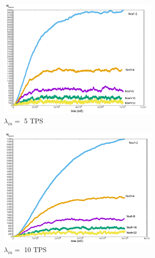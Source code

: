 \documentclass[a4paper,10pt,twocolumn]{article}
\begin{document}
\begin{appendices}
	 \space{1cm}
	
	 \begin{figure}[H]
		\begin{center}
		\includegraphics[width=80mm]{5sec.png}
		  \caption{\( \lambda_{in}=\) 5 TPS}
		\label{fig:sec5}
		\end{center}
	 \end{figure}
	
	 \begin{figure}[H]
		\begin{center}
		\includegraphics[width=80mm]{10sec.png}
		  \caption{\( \lambda_{in}=\) 10 TPS}
		\label{fig:sec10}
		\end{center}
	 \end{figure}
	\end{appendices}
	
\end{document}
